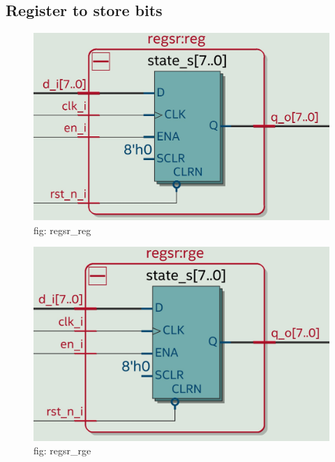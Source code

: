 \documentclass[12pt,a4 paper] {article}
\begin{document}
\subsection{Register to store bits}
\begin{figure}[h]
	\centering	
	\includegraphics[scale=0.1]{../png/regsr_reg.png}
	\newline
	fig: regsr\_reg\\
\end{figure}
\begin{figure}[h]
	\centering	
	\includegraphics[scale=0.1]{../png/regsr_rge.png}
	\newline
	fig: regsr\_rge\\
\end{figure}
\newpage
\end{document}
